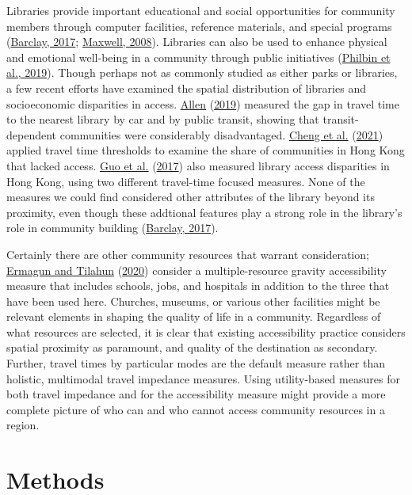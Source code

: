 \documentclass[3p, authoryear, review]{elsarticle} %
\begin{document}
Libraries provide important educational and social opportunities for community
members through computer facilities, reference materials, and special programs
(\protect\hyperlink{ref-barclay2017space}{Barclay, 2017}; \protect\hyperlink{ref-maxwell2008libraries}{Maxwell, 2008}). Libraries can also be used to
enhance physical and emotional well-being in a community through public
initiatives (\protect\hyperlink{ref-philbin2019}{Philbin et al., 2019}). Though perhaps not as commonly studied as either
parks or libraries, a few recent efforts have examined the spatial distribution
of libraries and socioeconomic disparities in access. \protect\hyperlink{ref-allen2019}{Allen} (\protect\hyperlink{ref-allen2019}{2019}) measured the
gap in travel time to the nearest library by car and by public transit, showing
that transit-dependent communities were considerably disadvantaged. \protect\hyperlink{ref-cheng2021}{Cheng et al.} (\protect\hyperlink{ref-cheng2021}{2021})
applied travel time thresholds to examine the share of communities in Hong Kong
that lacked access. \protect\hyperlink{ref-guo2017}{Guo et al.} (\protect\hyperlink{ref-guo2017}{2017}) also measured library access disparities in Hong Kong,
using two different travel-time focused measures. None of the measures we could
find considered other attributes of the library beyond its proximity, even though
these addtional features play a strong role in the library's role in community building
(\protect\hyperlink{ref-barclay2017space}{Barclay, 2017}).

Certainly there are other community resources that warrant consideration;
\protect\hyperlink{ref-ermagun2020}{Ermagun and Tilahun} (\protect\hyperlink{ref-ermagun2020}{2020}) consider a multiple-resource gravity accessibility measure that
includes schools, jobs, and hospitals in addition to the three that have been used here.
Churches, museums, or various other facilities might be relevant elements
in shaping the quality of life in a community. Regardless of what resources
are selected, it is clear that existing accessibility practice considers spatial
proximity as paramount, and quality of the destination as secondary. Further,
travel times by particular modes are the default measure rather than holistic,
multimodal travel impedance measures. Using utility-based measures for both
travel impedance and for the accessibility measure might provide a more
complete picture of who can and who cannot access community resources in a region.

\hypertarget{methods}{%
\section{Methods}\label{methods}}
\end{document}
